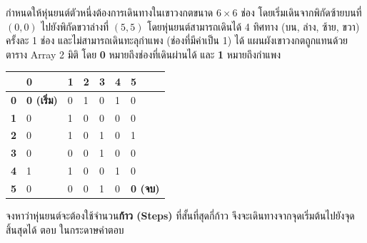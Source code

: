\question กำหนดให้หุ่นยนต์ตัวหนึ่งต้องการเดินทางในเขาวงกตขนาด $6 \times 6$ ช่อง โดยเริ่มเดินจากพิกัดซ้ายบนที่ $(0,0)$ ไปยังพิกัดขวาล่างที่ $(5,5)$ โดยหุ่นยนต์สามารถเดินได้ 4 ทิศทาง (บน, ล่าง, ซ้าย, ขวา) ครั้งละ 1 ช่อง และไม่สามารถเดินทะลุกำแพง (ช่องที่มีค่าเป็น 1) ได้ แผนผังเขาวงกตถูกแทนด้วยตาราง Array 2 มิติ โดย \textbf{0} หมายถึงช่องที่เดินผ่านได้ และ \textbf{1} หมายถึงกำแพง

\begin{center}
\begin{tabular}{|w{c}{1cm}|*{6}{w{c}{1.8cm}|}}
\hline
& \textbf{0} & \textbf{1} & \textbf{2} & \textbf{3} & \textbf{4} & \textbf{5} \\
\hline
\textbf{0} & \textbf{0 (เริ่ม)} & 0 & 1 & 0 & 1 & 0 \\
\hline
\textbf{1} & 0 & 1 & 0 & 0 & 0 & 0 \\
\hline
\textbf{2} & 0 & 1 & 0 & 1 & 0 & 1 \\
\hline
\textbf{3} & 0 & 0 & 0 & 1 & 0 & 0 \\
\hline
\textbf{4} & 1 & 1 & 0 & 0 & 1 & 0 \\
\hline
\textbf{5} & 0 & 0 & 0 & 1 & 0 & \textbf{0 (จบ)} \\
\hline
\end{tabular}
\end{center}

จงหาว่าหุ่นยนต์จะต้องใช้จำนวน\textbf{ก้าว (Steps)} ที่สั้นที่สุดกี่ก้าว จึงจะเดินทางจากจุดเริ่มต้นไปยังจุดสิ้นสุดได้
\newline\newline
ตอบ ในกระดาษคำตอบ \newline
